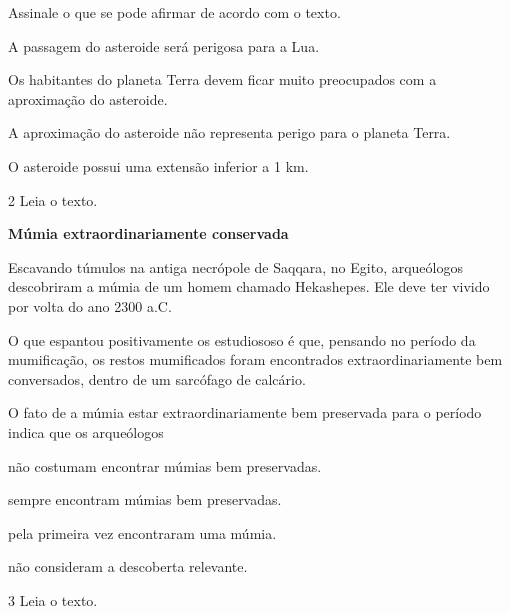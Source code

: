 Assinale o que se pode afirmar de acordo com o texto.

\begin{escolha}
\item A passagem do asteroide será perigosa para a Lua.

\item Os habitantes do planeta Terra devem ficar muito preocupados com a
aproximação do asteroide.

\item A aproximação do asteroide não representa perigo para o planeta
Terra.

\item O asteroide possui uma extensão inferior a 1 km.
\end{escolha}

\num{2} Leia o texto.

\begin{myquote}
\textbf{Múmia extraordinariamente conservada}

Escavando túmulos na antiga necrópole de Saqqara, no Egito, arqueólogos descobriram a múmia de um homem chamado Hekashepes. Ele deve ter vivido por volta do ano 2300 a.C.

O que espantou positivamente os estudiososo é que, pensando no período da mumificação, os restos mumificados foram encontrados extraordinariamente bem conversados, dentro de um sarcófago de calcário.

\end{myquote}

O fato de a múmia estar extraordinariamente bem preservada para o período
indica que os arqueólogos

\begin{escolha}
\item não costumam encontrar múmias bem preservadas.

\item sempre encontram múmias bem preservadas.

\item pela primeira vez encontraram uma múmia.

\item não consideram a descoberta relevante.
\end{escolha}


\num{3} Leia o texto.

